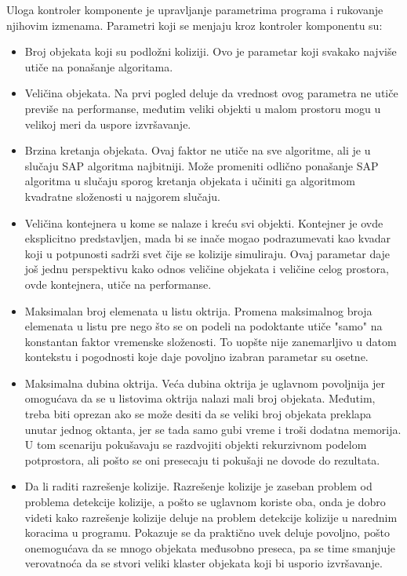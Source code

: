 \documentclass[12pt,oneside]{memoir}
\begin{document}
Uloga kontroler komponente je upravljanje parametrima programa i rukovanje njihovim izmenama.
Parametri koji se menjaju kroz kontroler komponentu su: 
\begin{itemize}  
	\item Broj objekata koji su podložni koliziji. 
	Ovo je parametar koji svakako najviše utiče na ponašanje algoritama.
	\item Veličina objekata. 
	Na prvi pogled deluje da vrednost ovog parametra ne utiče previše na performanse, međutim veliki objekti u malom prostoru mogu u velikoj meri da uspore izvršavanje.
	\item Brzina kretanja objekata.
	Ovaj faktor ne utiče na sve algoritme, ali je u slučaju SAP algoritma najbitniji. Može promeniti odlično ponašanje SAP algoritma u slučaju sporog kretanja 
	objekata i učiniti ga algoritmom kvadratne složenosti u najgorem slučaju.
	\item Veličina kontejnera u kome se nalaze i kreću svi objekti. Kontejner je ovde eksplicitno predstavljen, mada bi se inače mogao podrazumevati kao kvadar 
	koji u potpunosti sadrži svet čije se kolizije simuliraju.
	Ovaj parametar daje još jednu perspektivu kako odnos veličine objekata i veličine celog prostora, ovde kontejnera, utiče na performanse.
	\item Maksimalan broj elemenata u listu oktrija.
	Promena maksimalnog broja elemenata u listu pre nego što se on podeli na podoktante utiče "samo" na konstantan faktor vremenske složenosti.
	To uopšte nije zanemarljivo u datom kontekstu i pogodnosti koje daje povoljno izabran parametar su osetne.
	\item Maksimalna dubina oktrija. Veća dubina oktrija je uglavnom povoljnija jer omogućava da se u listovima oktrija nalazi mali broj objekata.
	Međutim, treba biti oprezan ako se može desiti 
	da se veliki broj objekata preklapa unutar jednog oktanta, jer se tada samo gubi vreme i troši dodatna memorija. 
	U tom scenariju pokušavaju se razdvojiti objekti rekurzivnom podelom potprostora, ali pošto se oni presecaju ti pokušaji ne dovode do rezultata.
	\item Da li raditi razrešenje kolizije. 
	Razrešenje kolizije je zaseban problem od problema detekcije kolizije, a pošto se uglavnom koriste oba, onda je dobro videti 
	kako razrešenje kolizije deluje na problem detekcije kolizije u narednim koracima u programu. Pokazuje se da praktično uvek deluje povoljno, pošto onemogućava da se mnogo 
	objekata međusobno preseca, pa se time smanjuje verovatnoća da se stvori veliki klaster objekata koji bi usporio izvršavanje.

\end{itemize}
\end{document}
